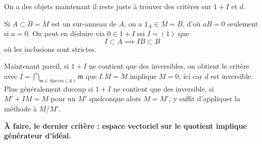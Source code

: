 \documentclass[a4paper,12pt]{book}
\newcommand{\m}{\mathfrak{m}}
\theoremstyle{plain}
\theoremstyle{definition}
\theoremstyle{remark}
\begin{document}
On a des objets maintenant il reste juste à trouver des critères sur
$1+I$ et $d$.

Si $A\subset B=M$ est un sur-anneau de $A$, on a $1_A\in M=B$,
d'où $aB=0$ seulement si $a=0$. On peut en déduire via 
$0\in1+I$ ssi $I=(1)$ que 
\[I\subset A\implies IB\subset B\]
où les inclusions sont strictes.

Maintenant pareil, si $1+I$ ne contient que des inversibles, on obtient
le critère avec $I=\bigcap_{\m\in Specm(A)} \m$ que $I.M=M$ implique
$M=0$, ici car $d$ est inversible. Plus généralement ducoup si $1+I$
ne contient que des inversible, si $M'+IM=M$ pour un $M'$ quelconque 
alors $M=M'$, y suffit d'appliquer la méthode à $M/M'$.

\textbf{À faire, le dernier critère : espace vectoriel sur le quotient
implique générateur d'idéal.}




\printbibliography
\end{document}
